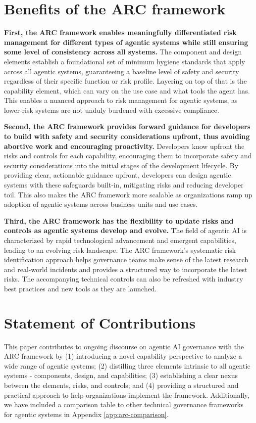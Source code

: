 \documentclass{article}
\begin{document}
\section{Benefits of the ARC framework}

\textbf{First, the ARC framework enables meaningfully differentiated risk management for different types of agentic systems while still ensuring some level of consistency across all systems.} The component and design elements establish a foundational set of minimum hygiene standards that apply across all agentic systems, guaranteeing a baseline level of safety and security regardless of their specific function or risk profile. Layering on top of that is the capability element, which can vary on the use case and what tools the agent has. This enables a nuanced approach to risk management for agentic systems, as lower-risk systems are not unduly burdened with excessive compliance. 

\textbf{Second, the ARC framework provides forward guidance for developers to build with safety and security considerations upfront, thus avoiding abortive work and encouraging proactivity.} Developers know upfront the risks and controls for each capability, encouraging them to incorporate safety and security considerations into the initial stages of the development lifecycle. By providing clear, actionable guidance upfront, developers can design agentic systems with these safeguards built-in, mitigating risks and reducing developer toil. This also makes the ARC framework more scalable as organizations ramp up adoption of agentic systems across business units and use cases. 

\textbf{Third, the ARC framework has the flexibility to update risks and controls as agentic systems develop and evolve.} The field of agentic AI is characterized by rapid technological advancement and emergent capabilities, leading to an evolving risk landscape. The ARC framework’s systematic risk identification approach helps governance teams make sense of the latest research and real-world incidents and provides a structured way to incorporate the latest risks. The accompanying technical controls can also be refreshed with industry best practices and new tools as they are launched. 

\section{Statement of Contributions}

This paper contributes to ongoing discourse on agentic AI governance with the ARC framework by (1) introducing a novel capability perspective to analyze a wide range of agentic systems; (2) distilling three elements intrinsic to all agentic systems - components, design, and capabilities; (3) establishing a clear nexus between the elements, risks, and controls; and (4) providing a structured and practical approach to help organizations implement the framework. Additionally, we have included a comparison table to other technical governance frameworks for agentic systems in Appendix \ref{app:arc-comparison}.
\end{document}
